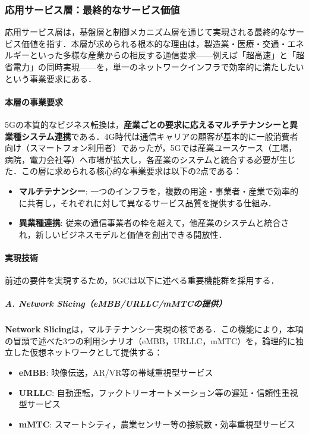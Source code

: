 \subsubsection{応用サービス層：最終的なサービス価値}

応用サービス層は，基盤層と制御メカニズム層を通じて実現される最終的なサービス価値を指す．本層が求められる根本的な理由は，製造業・医療・交通・エネルギーといった多様な産業からの相反する通信要求——例えば「超高速」と「超省電力」の同時実現——を，単一のネットワークインフラで効率的に満たしたいという事業要求にある．

\paragraph{本層の事業要求}

5Gの本質的なビジネス転換は，\textbf{産業ごとの要求に応えるマルチテナンシーと異業種システム連携}である．4G時代は通信キャリアの顧客が基本的に一般消費者向け（スマートフォン利用者）であったが，5Gでは産業ユースケース（工場，病院，電力会社等）へ市場が拡大し，各産業のシステムと統合する必要が生じた．この層に求められる核心的な事業要求は以下の2点である：

\begin{itemize}
\item \textbf{マルチテナンシー}: 一つのインフラを，複数の用途・事業者・産業で効率的に共有し，それぞれに対して異なるサービス品質を提供する仕組み．
\item \textbf{異業種連携}: 従来の通信事業者の枠を越えて，他産業のシステムと統合され，新しいビジネスモデルと価値を創出できる開放性．
\end{itemize}

\paragraph{実現技術}

前述の要件を実現するため，5GCは以下に述べる重要機能群を採用する．

\subparagraph{A. Network Slicing（eMBB/URLLC/mMTCの提供）}

\textbf{Network Slicing}は，マルチテナンシー実現の核である．この機能により，本項の冒頭で述べた3つの利用シナリオ（eMBB，URLLC，mMTC）を，論理的に独立した仮想ネットワークとして提供する：

\begin{itemize}
\item \textbf{eMBB}: 映像伝送，AR/VR等の帯域重視型サービス
\item \textbf{URLLC}: 自動運転，ファクトリーオートメーション等の遅延・信頼性重視型サービス
\item \textbf{mMTC}: スマートシティ，農業センサー等の接続数・効率重視型サービス
\end{itemize}

